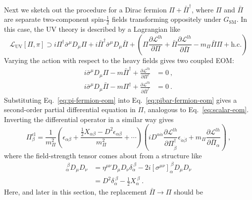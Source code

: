 Next we sketch out the procedure for a Dirac fermion
$\Pi + \bar{\Pi}^{\dagger}$, where $\Pi$ and $\bar{\Pi}$ are separate
two-component spin-$\tfrac{1}{2}$ fields transforming oppositely under
$G_{\text{SM}}$. In this case, the UV theory is described by a Lagrangian like
\begin{equation}
  \label{eq:fermion-lag}
  \mathscr{L}_{\text{UV}}[\Pi, \pi] \supset i \Pi^{\dagger} \bar{\sigma}^{\mu} D_{\mu} \Pi + i \bar{\Pi}^{\dagger} \bar{\sigma}^{\mu} D_{\mu} \bar{\Pi} + \left( \Pi \frac{\partial \mathscr{L}^{lh}}{\partial \Pi} + \bar{\Pi} \frac{\partial \mathscr{L}^{lh}}{\partial \bar{\Pi}} - m_{\Pi} \bar{\Pi} \Pi  + \text{h.c.} \right)
\end{equation}
Varying the action with respect to the heavy fields gives two coupled EOM:
\begin{align}
 i \bar{\sigma}^{\mu} D_{\mu} \Pi - m \bar{\Pi}^{\dagger} + \frac{\partial \mathscr{L}^{lh}}{\partial \Pi^{\dagger}} &= 0 \ , \label{eq:pi-fermion-eom} \\
 i \bar{\sigma}^{\mu} D_{\mu} \bar{\Pi} - m \Pi^{\dagger} + \frac{\partial \mathscr{L}^{lh}}{\partial \bar{\Pi}^{\dagger}} &= 0 \ . \label{eq:pibar-fermion-eom}
\end{align}
Substituting Eq.~\eqref{eq:pi-fermion-eom} into Eq.~\eqref{eq:pibar-fermion-eom}
gives a second-order partial differential equation in $\Pi$, analogous to
Eq.~\eqref{eq:scalar-eom}. Inverting the differential operator in a similar way
gives
\begin{equation}
  \label{eq:fermion-repl}
  \Pi^{\text{cl}}_{\beta} = \frac{1}{m_{\Pi}^{2}} \left( \epsilon_{\alpha \beta} + \frac{ \tfrac{1}{2} X_{\alpha \beta} - D^{2} \epsilon_{\alpha \beta}}{m_{\Pi}^{2}} + \cdots \right) \left( i D^{\alpha \dot{\alpha}} \frac{\partial \mathscr{L}^{lh}}{\partial \Pi^{\dagger}_{\dot{\beta}}} \epsilon_{\dot{\alpha} \dot{\beta}} + m_{\Pi} \frac{\partial \mathscr{L}^{lh}}{\partial \bar{\Pi}_{\alpha}} \right) \ ,
\end{equation}
where the field-strength tensor comes about from a structure like
\begin{align}
  [\sigma^{\mu} \bar{\sigma}^{\nu}]_{\alpha}^{\ \beta} D_{\mu} D_{\nu} &= \eta^{\mu\nu} D_{\mu} D_{\nu} \delta_{\alpha}^{\ \beta} - 2i [\sigma^{\mu\nu}]_{\alpha}^{\ \beta} D_{\mu} D_{\nu} \\
  &= D^{2} \delta_{\alpha}^{\ \beta} - \tfrac{1}{2} X_{\alpha}^{\ \beta} \ .
\end{align}
Here, and later in this section, the replacement $\bar{\Pi} \to \Pi$ should be
